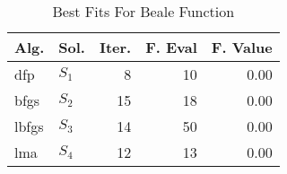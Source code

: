 \begin{table}
\centering
\caption{Best Fits For Beale Function}
\label{solutions:beale}
\begin{tabular}{llrrr}
\toprule
 Alg. &    Sol. &  Iter. &  F. Eval &  F. Value \\
\midrule
  dfp & $S_{1}$ &      8 &       10 &      0.00 \\
 bfgs & $S_{2}$ &     15 &       18 &      0.00 \\
lbfgs & $S_{3}$ &     14 &       50 &      0.00 \\
  lma & $S_{4}$ &     12 &       13 &      0.00 \\
\bottomrule
\end{tabular}
\end{table}
